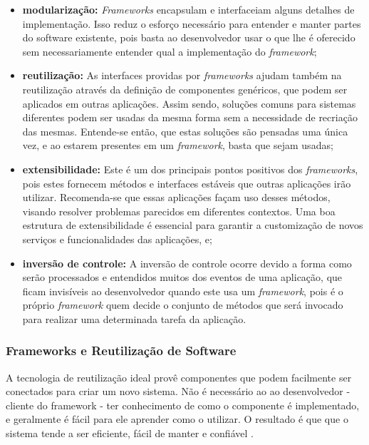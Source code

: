 \begin{itemize}
	\item \textbf{modularização:} \textit{Frameworks} encapsulam e interfaceiam alguns detalhes de implementação. Isso reduz o esforço necessário para entender e manter partes do software existente, pois basta ao desenvolvedor usar o que lhe é oferecido sem necessariamente entender qual a implementação do \textit{framework};

	\item \textbf{reutilização:} As interfaces providas por \textit{frameworks} ajudam também na reutilização através da definição de componentes genéricos, que podem ser aplicados em outras aplicações. Assim sendo, soluções comuns para sistemas diferentes podem ser usadas da mesma forma sem a necessidade de recriação das mesmas. Entende-se então, que estas soluções são pensadas uma única vez, e ao estarem presentes em um \textit{framework}, basta que sejam usadas;

	\item \textbf{extensibilidade:} Este é um dos principais pontos positivos dos \textit{frameworks}, pois estes fornecem métodos e interfaces estáveis que outras aplicações irão utilizar. Recomenda-se que essas aplicações façam uso desses métodos, visando resolver problemas parecidos em diferentes contextos. Uma boa estrutura de extensibilidade é essencial para garantir a customização de novos serviços e funcionalidades das aplicações, e;

	\item \textbf{inversão de controle:} A inversão de controle ocorre devido a forma como serão processados e entendidos muitos dos eventos de uma aplicação, que ficam invisíveis ao desenvolvedor quando este usa um \textit{framework}, pois é o próprio \textit{framework} quem decide o conjunto de métodos que será invocado para realizar uma determinada tarefa da aplicação.
\end{itemize}

\subsubsection{Frameworks e Reutilização de Software}

A tecnologia de reutilização ideal provê componentes que podem facilmente ser conectados para criar um novo sistema. Não é necessário ao ao desenvolvedor - cliente do framework - ter conhecimento de como o componente é implementado, e geralmente é fácil para ele aprender como o utilizar. O resultado é que que o sistema tende a ser eficiente, fácil de manter e confiável \cite{Johnson:1997}.

